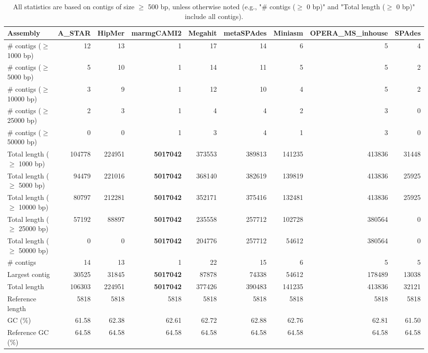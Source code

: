 \documentclass[12pt,a4paper]{article}
\begin{document}
\begin{table}[ht]
\begin{center}
\caption{All statistics are based on contigs of size $\geq$ 500 bp, unless otherwise noted (e.g., "\# contigs ($\geq$ 0 bp)" and "Total length ($\geq$ 0 bp)" include all contigs).}
\begin{tabular}{|l*{8}{|r}|}
\hline
Assembly & A\_STAR & HipMer & marmgCAMI2 & Megahit & metaSPAdes & Miniasm & OPERA\_MS\_inhouse & SPAdes \\ \hline
\# contigs ($\geq$ 1000 bp) & 12 & 13 & 1 & 17 & 14 & 6 & 5 & 4 \\ \hline
\# contigs ($\geq$ 5000 bp) & 5 & 10 & 1 & 14 & 11 & 5 & 5 & 2 \\ \hline
\# contigs ($\geq$ 10000 bp) & 3 & 9 & 1 & 12 & 10 & 4 & 5 & 2 \\ \hline
\# contigs ($\geq$ 25000 bp) & 2 & 3 & 1 & 4 & 4 & 2 & 3 & 0 \\ \hline
\# contigs ($\geq$ 50000 bp) & 0 & 0 & 1 & 3 & 4 & 1 & 3 & 0 \\ \hline
Total length ($\geq$ 1000 bp) & 104778 & 224951 & {\bf 5017042} & 373553 & 389813 & 141235 & 413836 & 31448 \\ \hline
Total length ($\geq$ 5000 bp) & 94479 & 221016 & {\bf 5017042} & 368140 & 382619 & 139819 & 413836 & 25925 \\ \hline
Total length ($\geq$ 10000 bp) & 80797 & 212281 & {\bf 5017042} & 352171 & 375416 & 132481 & 413836 & 25925 \\ \hline
Total length ($\geq$ 25000 bp) & 57192 & 88897 & {\bf 5017042} & 235558 & 257712 & 102728 & 380564 & 0 \\ \hline
Total length ($\geq$ 50000 bp) & 0 & 0 & {\bf 5017042} & 204776 & 257712 & 54612 & 380564 & 0 \\ \hline
\# contigs & 14 & 13 & 1 & 22 & 15 & 6 & 5 & 5 \\ \hline
Largest contig & 30525 & 31845 & {\bf 5017042} & 87878 & 74338 & 54612 & 178489 & 13038 \\ \hline
Total length & 106303 & 224951 & {\bf 5017042} & 377426 & 390483 & 141235 & 413836 & 32121 \\ \hline
Reference length & 5818 & 5818 & 5818 & 5818 & 5818 & 5818 & 5818 & 5818 \\ \hline
GC (\%) & 61.58 & 62.38 & 62.61 & 62.72 & 62.88 & 62.76 & 62.81 & 61.50 \\ \hline
Reference GC (\%) & 64.58 & 64.58 & 64.58 & 64.58 & 64.58 & 64.58 & 64.58 & 64.58 \\ \hline

\end{tabular}
\end{center}
\end{table}
\end{document}
